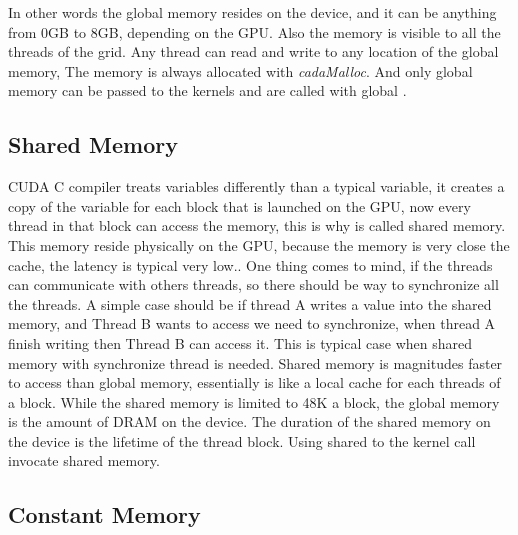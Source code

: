 In other words the global memory resides on the device, and it can be anything from 0GB to 8GB, depending on the GPU. Also the memory is visible to all the threads of the grid. Any thread can read and write to any location of the global memory, The memory is always allocated with \textit{cadaMalloc}. And only global memory can be passed to the kernels and are called with \twoline global \twoline.


\cite{design}



\subsection{Shared Memory}

CUDA C compiler treats variables differently than a typical variable, it creates a copy of the variable for each block that is launched on the GPU, now every thread in that block can access the memory, this is why is called shared memory. This memory reside physically on the GPU, because the memory is very close the cache, the latency is typical very low.\cite{example}. One thing comes to mind, if the threads can communicate with others threads, so there should be way to synchronize all the threads. A simple case should be if thread A writes a value into the shared memory, and Thread B wants to access we need to synchronize, when thread A finish writing then Thread B can access it. This is typical case when shared memory with synchronize thread is needed. \cite{cook}
Shared memory is magnitudes faster to access than global memory, essentially is like a local cache for each threads of a block. While  the shared memory is limited to 48K a block, the global memory is the amount of DRAM on the device. The duration of the shared memory on the device is the lifetime of the thread block. Using \twoline shared \twoline to the kernel call invocate shared memory.


\subsection{Constant Memory}

